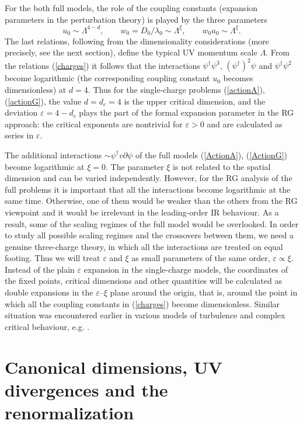 \documentclass[12pt]{article}
\begin{document}
For the both full models, the role of the coupling constants (expansion
parameters in the perturbation theory) is played by the three parameters
\begin{equation}
u_{0}  \sim \Lambda^{4-d}, \qquad
w_{0} = D_{0}/\lambda_{0} \sim \Lambda^{\xi},
\qquad w_{0}a_{0} \sim \Lambda^{\xi}.
\label{charges}
\end{equation}
The last relations, following from the dimensionality considerations
(more precisely, see the next section), define the typical UV momentum
scale $\Lambda$. From the relations (\ref{charges}) it follows that the
interactions $\psi^{\dagger}\psi^{3}$, $(\psi^{\dagger})^2\psi$ and
$\psi^{\dagger}\psi^2$ become logarithmic (the corresponding coupling
constant $u_{0}$ becomes dimensionless) at $d=4$.
Thus for the single-charge problems (\ref{actionA}), (\ref{actionG}),
the value $d=d_{c}=4$ is
the upper critical dimension, and the deviation $\varepsilon=4-d_{c}$ plays the
part of the formal expansion parameter in the RG approach: the critical
exponents are nontrivial for $\varepsilon>0$ and are calculated as series in
$\varepsilon$.

The additional interactions $\sim \psi^{\dag} v\partial \psi $
of the full models (\ref{ActionA}), (\ref{ActionG})
become logarithmic at $\xi=0$. The parameter $\xi$ is not
related to the spatial dimension and can be varied independently. However,
for the RG analysis of the full problems it is important that
all the interactions become logarithmic at the same time. Otherwise, one
of them would be weaker than the others from the RG viewpoint and it would
be irrelevant in the leading-order IR behaviour. As a result, some of the
scaling regimes of the full model would be overlooked.
In order to study all possible scaling regimes and the crossovers between
them, we need a genuine three-charge theory, in which all the interactions
are treated on equal footing. Thus we will treat $\varepsilon$ and $\xi$ as
small parameters of the same order, $\varepsilon \propto \xi$.
Instead of the plain $\varepsilon$ expansion in the single-charge models,
the coordinates of the fixed points, critical dimensions
and other quantities will be calculated as double expansions in the
$\varepsilon$--$\xi$ plane around the origin, that is, around the point in which
all the coupling constants in (\ref{charges}) become dimensionless.
Similar situation was encountered earlier in various models of turbulence
and complex critical behaviour, e.g. \cite{AHH,Alexa,AIK,AIM,Sak}.


\section{Canonical dimensions, UV divergences and the renormalization}
\label{sec:Reno}
\end{document}
